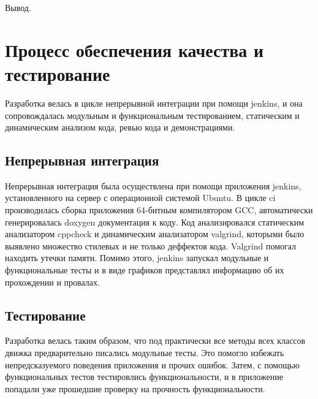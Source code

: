 Вывод.

\section*{Процесс обеспечения качества и тестирование}


Разработка велась в цикле непрерывной интеграции при помощи jenkins, и она сопровождалась модульным и функциональным тестированием, статическим и динамическим анализом кода, ревью кода и демонстрациями.

\subsection*{Непрерывная интеграция}

	Непрерывная интеграция была осуществлена при помощи приложения jenkins, установленного на сервер с операционной системой Ubuntu. В цикле ci производилась сборка приложения 64-битным компилятором GCC, автоматически генерировалась doxygen документация к коду. Код анализировался статическим анализатором cppcheck и динамическим анализатором valgrind, которыми было выявлено множество стилевых и не только деффектов кода. Valgrind помогал находить утечки памяти. Помимо этого, jenkins запускал модульные и функциональные тесты и в виде графиков представлял информацию об их прохождении и провалах.
	
\subsection*{Тестирование}

Разработка велась таким образом, что под практически все методы всех классов движка предварительно писались модульные тесты. Это помогло избежать непредсказуемого поведения приложения и прочих ошибок. Затем, с помощью функциональных тестов тестировлись функциональности, и в приложение попадали уже прошедшие проверку на прочность функциональности.

